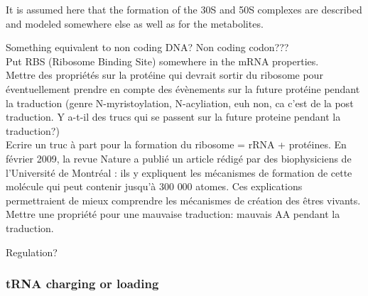 It is assumed here that the formation of the 30S and 50S complexes are described and modeled somewhere else as well as for the metabolites.

\textcolor[rgb]{1.00,0.00,0.00}{Something equivalent to non coding DNA? Non coding codon???} \\
\textcolor[rgb]{1.00,0.00,0.00}{Put RBS (Ribosome Binding Site) somewhere in the mRNA properties.} \\
\textcolor[rgb]{1.00,0.00,0.00}{Mettre des propriétés sur la protéine qui devrait sortir du ribosome pour éventuellement prendre en compte des évènements sur la future protéine pendant la traduction (genre N-myristoylation, N-acyliation, euh non, ca c'est de la post traduction. Y a-t-il des trucs qui se passent sur la future proteine pendant la traduction?)} \\
\textcolor[rgb]{1.00,0.00,0.00}{Ecrire un truc à part pour la formation du ribosome = rRNA + protéines. En février 2009, la revue Nature a publié un article rédigé par des biophysiciens de l'Université de Montréal : ils y expliquent les mécanismes de formation de cette molécule qui peut contenir jusqu'à 300 000 atomes. Ces explications permettraient de mieux comprendre les mécanismes de création des êtres vivants.} \\
\textcolor[rgb]{1.00,0.00,0.00}{Mettre une propriété pour une mauvaise traduction: mauvais AA pendant la traduction.} \\

\bigskip

\textcolor[rgb]{1.00,0.00,0.00}{\Huge Regulation?}


\subsubsection{tRNA charging or loading}
